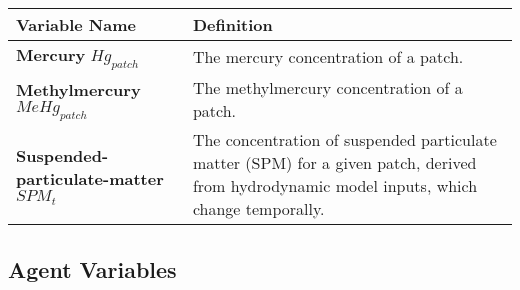 \documentclass[
]{book}
\begin{document}
\begin{longtable}[]{@{}
  >{\raggedright\arraybackslash}p{}
  >{\raggedright\arraybackslash}p{}@{}}
\toprule\noalign{}
\begin{minipage}[b]{\linewidth}\raggedright
Variable Name
\end{minipage} & \begin{minipage}[b]{\linewidth}\raggedright
Definition
\end{minipage} \\
\midrule\noalign{}
\endhead
\bottomrule\noalign{}
\endlastfoot
\textbf{Mercury} \(Hg_{patch}\) & The mercury concentration of a patch. \\
\textbf{Methylmercury} \(MeHg_{patch}\) & The methylmercury concentration of a patch. \\
\textbf{Suspended-particulate-matter} \(SPM_{t}\) & The concentration of suspended particulate matter (SPM) for a given patch, derived from hydrodynamic model inputs, which change temporally. \\
\end{longtable}

\subsection{Agent Variables}\label{agent-variables-1}
\end{document}
